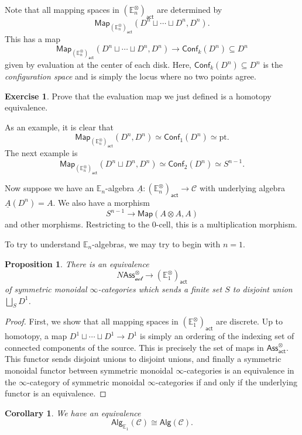 \documentclass[10pt]{amsart}
\newtheorem{cor}[thm]{Corollary}
\newtheorem{prop}[thm]{Proposition}
\theoremstyle{definition}
\newtheorem{exer}[thm]{Exercise}
\theoremstyle{remark}
\theoremstyle{plain}
\theoremstyle{definition}
\theoremstyle{remark}
\newcommand{\E}{\mathbb{E}}
\newcommand{\mc}[1]{\mathcal{#1}}
\newcommand{\mr}[1]{\mathrm{#1}}
\newcommand{\ms}[1]{\mathsf{#1}}
\newcommand{\ul}[1]{\underline{#1}}
\newcommand{\1}{\mathbf{1}}
\newcommand{\2}{\mathbf{2}}
\newcommand{\3}{\mathbf{3}}
\newcommand{\pt}{\mr{pt}}
\begin{document}
Note that all mapping spaces in $(\E_n^{\otimes})_{\ms{act}}$ are determined by
\[ \ms{Map}_{(\E_n^{\otimes})_{\ms{act}}} (D^n \sqcup \cdots \sqcup D^n, D^n). \]
This has a map
\[ \ms{Map}_{(\E_n^{\otimes})_{\ms{act}}} (D^n \sqcup \cdots \sqcup D^n, D^n) \to \ms{Conf}_k (D^n) \subseteq D^n \]
given by evaluation at the center of each disk. Here, $\ms{Conf}_k(D^n) \subseteq D^n$ is the \textit{configuration space} and is simply the locus where no two points agree.

\begin{exer}
    Prove that the evaluation map we just defined is a homotopy equivalence.
\end{exer}

As an example, it is clear that
\[ \ms{Map}_{(\E_n^{\otimes})_{\ms{act}}} (D^n, D^n) \simeq \ms{Conf}_1 (D^n) \simeq \pt. \]
The next example is
\[ \ms{Map}_{(\E_n^{\otimes})_{\ms{act}}} (D^n \sqcup D^n, D^n) \simeq \ms{Conf}_2 (D^n) \simeq S^{n-1}. \]

Now suppose we have an $\E_n$-algebra $\ul{A} \colon (\E_n^{\otimes})_{\ms{act}} \to \mc{C}$ with underlying algebra $\ul{A}(D^n) = A$. We also have a morphism
\[ S^{n-1} \to \ms{Map}(A \otimes A, A) \]
and other morphisms. Restricting to the $0$-cell, this is a multiplication morphism.

To try to understand $\E_n$-algebras, we may try to begin with $n=1$.
\begin{prop}
    There is an equivalence
    \[ N\ms{Ass}_{\mc{act}}^{\otimes} \to (\E_1^{\otimes})_{\ms{act}} \]
    of symmetric monoidal $\infty$-categories which sends a finite set $S$ to disjoint union $\bigsqcup_S D^1$.
\end{prop}

\begin{proof}
    First, we show that all mapping spaces in $(\E_1^{\otimes})_{\ms{act}}$ are discrete. Up to homotopy, a map $D^1 \sqcup \cdots \sqcup D^1 \to D^1$ is simply an ordering of the indexing set of connected components of the source. This is precisely the set of maps in $\ms{Ass}_{\ms{act}}^{\otimes}$. This functor sends disjoint unions to disjoint unions, and finally a symmetric monoidal functor between symmetric monoidal $\infty$-categories is an equivalence in the $\infty$-category of symmetric monoidal $\infty$-categories if and only if the underlying functor is an equivalence.
\end{proof}

\begin{cor}
    We have an equivalence
    \[ \ms{Alg}_{\E_1}(\mc{C}) \cong \ms{Alg}(\mc{C}). \]
\end{cor}
\end{document}

